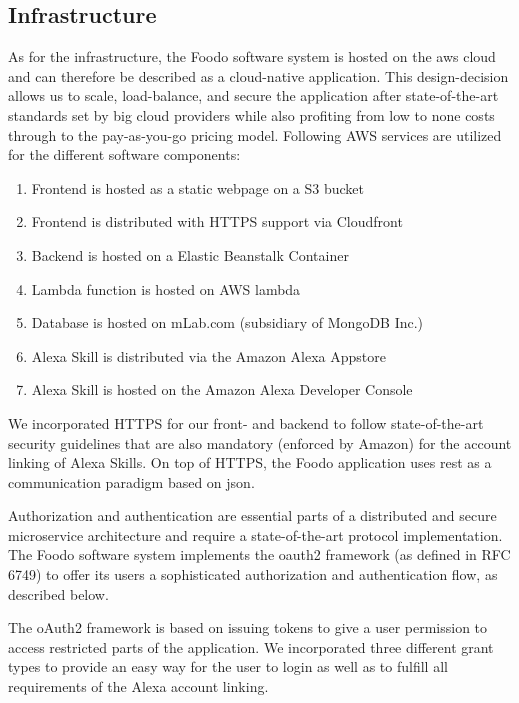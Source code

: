 \subsection{Infrastructure}
As for the infrastructure, the Foodo software system is hosted on the \gls{aws} cloud and can therefore be described as a cloud-native application. This design-decision allows us to scale, load-balance, and secure the application after state-of-the-art standards set by big cloud providers while also profiting from low to none costs through to the pay-as-you-go pricing model. Following AWS services are utilized for the different software components:

\begin{enumerate}
	\itemsep-0.5em 
	\item Frontend is hosted as a static webpage on a S3 bucket
	\item Frontend is distributed with HTTPS support via Cloudfront
	\item Backend is hosted on a Elastic Beanstalk Container
	\item Lambda function is hosted on AWS lambda
	\item Database is hosted on mLab.com (subsidiary of MongoDB Inc.)
	\item Alexa Skill is distributed via the Amazon Alexa Appstore 
	\item Alexa Skill is hosted on the Amazon Alexa Developer Console
\end{enumerate}


We incorporated HTTPS for our front- and backend to follow state-of-the-art security guidelines that are also mandatory (enforced by Amazon) for the account linking of Alexa Skills. On top of HTTPS, the Foodo application uses \gls{rest} as a communication paradigm based on \gls{json}.

Authorization and authentication are essential parts of a distributed and secure microservice architecture and require a state-of-the-art protocol implementation. The Foodo software system implements the \gls{oauth2} framework (as defined in RFC 6749) to offer its users a sophisticated authorization and authentication flow, as described below. 


The oAuth2 framework is based on issuing tokens to give a user permission to access restricted parts of the application. We incorporated three different grant types to provide an easy way for the user to login as well as to fulfill all requirements of the Alexa account linking. 

